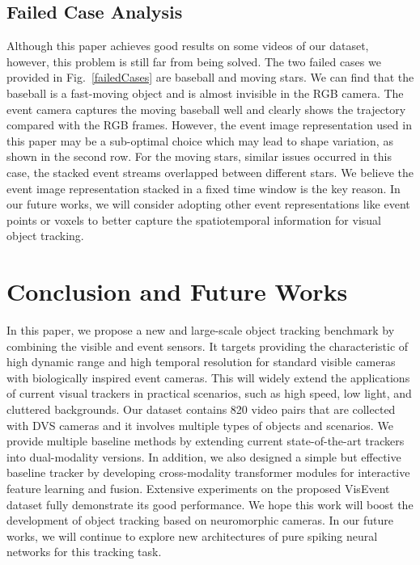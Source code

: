 \documentclass[journal]{IEEEtran}
\begin{document}
\subsection{Failed Case Analysis}   
Although this paper achieves good results on some videos of our dataset, however, this problem is still far from being solved. The two failed cases we provided in Fig.~\ref{failedCases} are baseball and moving stars. We can find that the baseball is a fast-moving object and is almost invisible in the RGB camera. The event camera captures the moving baseball well and clearly shows the trajectory compared with the RGB frames. However, the event image representation used in this paper may be a sub-optimal choice which may lead to shape variation, as shown in the second row. For the moving stars, similar issues occurred in this case, the stacked event streams overlapped between different stars. We believe the event image representation stacked in a fixed time window is the key reason. In our future works, we will consider adopting other event representations like event points or voxels to better capture the spatiotemporal information for visual object tracking.


 








\section{Conclusion and Future Works}
In this paper, we propose a new and large-scale object tracking benchmark by combining the visible and event sensors. It targets providing the characteristic of high dynamic range and high temporal resolution for standard visible cameras with biologically inspired event cameras. This will widely extend the applications of current visual trackers in practical scenarios, such as high speed, low light, and cluttered backgrounds. Our dataset contains 820 video pairs that are collected with DVS cameras and it involves multiple types of objects and scenarios. We provide multiple baseline methods by extending current state-of-the-art trackers into dual-modality versions. In addition, we also designed a simple but effective baseline tracker by developing cross-modality transformer modules for interactive feature learning and fusion. Extensive experiments on the proposed VisEvent dataset fully demonstrate its good performance. We hope this work will boost the development of object tracking based on neuromorphic cameras. In our future works, we will continue to explore new architectures of pure spiking neural networks for this tracking task.
\end{document}
